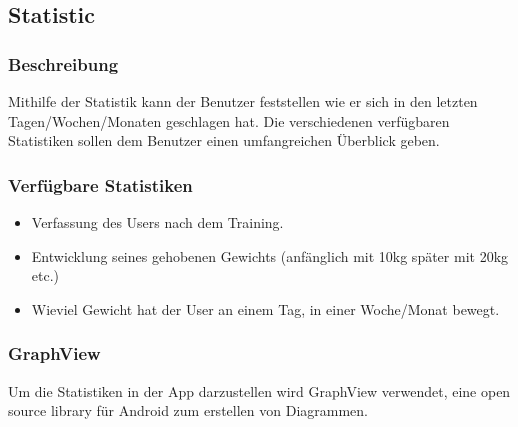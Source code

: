 \documentclass[FIPLY_base.tex]{subfiles}
\author{Gerald Irsiegler}
\date{26. Februar 2016}
\begin{document}
\subsection{Statistic}

\subsubsection{Beschreibung}
Mithilfe der Statistik kann der Benutzer feststellen wie er sich in den letzten Tagen/Wochen/Monaten geschlagen hat.
Die verschiedenen verfügbaren Statistiken sollen dem Benutzer einen umfangreichen Überblick geben.


\subsubsection{Verfügbare Statistiken}
\begin{itemize}
\item Verfassung des Users nach dem Training.
\item Entwicklung seines gehobenen Gewichts (anfänglich mit 10kg später mit 20kg etc.)
\item Wieviel Gewicht hat der User an einem Tag, in einer Woche/Monat bewegt.
\end{itemize}

\subsubsection{GraphView}
Um die Statistiken in der App darzustellen wird GraphView verwendet, eine open source library für Android zum erstellen von Diagrammen.
\end{document}
